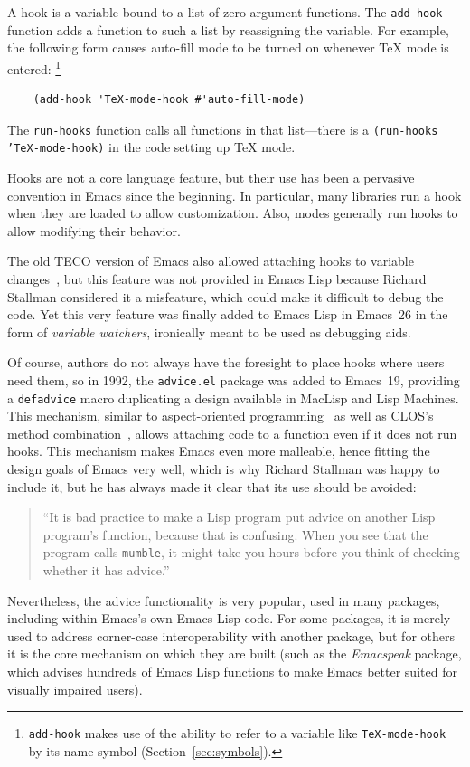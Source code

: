\documentclass[format=acmsmall,screen]{acmart}
\newcommand \Elisp {Emacs Lisp}
\begin{document}
A hook is a variable bound to a list of zero-argument
functions.  The \texttt{add-hook} function adds a function to such a
list by reassigning the variable.  For example, the following form
causes auto-fill mode to be turned on whenever \TeX{} mode is entered:%
\footnote{\texttt{add-hook} makes use of the ability to refer to a variable
          like \texttt{TeX-mode-hook} by its name symbol (Section~\ref{sec:symbols}).}
%
\begin{verbatim}
    (add-hook 'TeX-mode-hook #'auto-fill-mode)
\end{verbatim}
The \texttt{run-hooks} function calls all functions in that
list---there is a \texttt{(run-hooks 'TeX-mode-hook)} in the code
setting up \TeX{} mode.

Hooks are not a core language feature, but their use has been a
pervasive convention in Emacs since the beginning.  In particular, many
libraries run a hook when they are loaded to allow customization.
Also, modes generally run hooks to allow modifying their behavior.

The old TECO version of Emacs also allowed attaching hooks to variable
changes~\cite{Stallman1981}, but this feature was not provided in \Elisp{}
because Richard Stallman considered it a misfeature, which could make it
difficult to debug the code.  Yet this very feature was finally added to
\Elisp{} in Emacs~26 in the form of \emph{variable watchers},
ironically meant to be used as debugging aids.

Of course, authors do not always have the foresight to place hooks where
users need them, so in 1992, the \texttt{advice.el} package was added to
Emacs~19, providing a \texttt{defadvice} macro duplicating a design
available in MacLisp and Lisp Machines.  This mechanism, similar to
aspect-oriented programming~\cite{Kiczales97} as well as CLOS's method
combination~\cite{DeMichielGabriel1987}, allows attaching code to
a function even if it does not run hooks.
This mechanism
makes Emacs even more malleable, hence fitting the design goals of
Emacs very well, which is why Richard Stallman was happy to include it, but
he has always made it clear that its use should be avoided:
\begin{quotation}
  ``It is bad practice to make a Lisp
  program put advice on another Lisp program's function, because that is
  confusing.  When you see that the program calls \texttt{mumble}, it might
  take you hours before you think of checking whether it has
  advice.''~\cite{Stallman2018-personal}
\end{quotation}
Nevertheless, the advice functionality is very popular, used in many
packages, including within Emacs's own \Elisp{} code.  For some packages, it is
merely used to address corner-case interoperability with another package,
but for others it is the core mechanism on which they are built (such as
the \emph{Emacspeak} package, which advises hundreds of \Elisp{} functions to
make Emacs better suited for visually impaired users).
\end{document}
